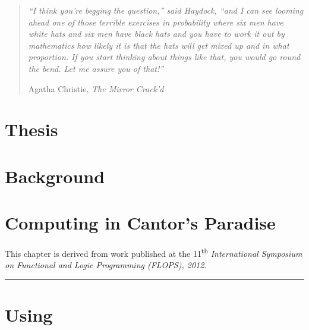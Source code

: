 \documentclass[phd,electronic,twosidetoc,letterpaper,chaptercenter,parttop,lof]{byumsphd}
\title{\Title}
\author{\Author}
\begin{document}
\maketitle
{}

\vspace*{\fill}
\begin{quote}
\textit{``I think you're begging the question,'' said Haydock, ``and I can see looming ahead one of those terrible exercises in probability where six men have white hats and six men have black hats and you have to work it out by mathematics how likely it is that the hats will get mixed up and in what proportion. If you start thinking about things like that, you would go round the bend. Let me assure you of that!''}

\hfill Agatha Christie, \textit{The Mirror Crack'd}
\end{quote}
\vspace*{\fill}

\chapter{Thesis}




\chapter{Background}
\label{ch:background}




\chapter{Computing in Cantor's Paradise}
\label{ch:lambda-zfc}

This chapter is derived from work published at the 11\textsuperscript{th} \emph{International Symposium on Functional and Logic Programming (FLOPS), 2012}.

\vspace{\baselineskip}
\hrule
\vspace{\baselineskip}




\chapter{Using \lzfclang}
\label{ch:using-lambda-zfc}
\end{document}
